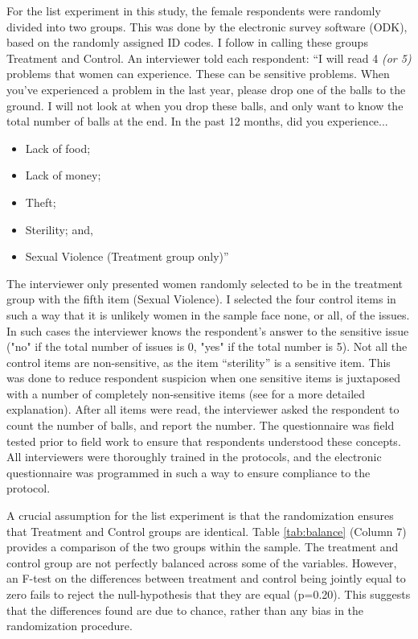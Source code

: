 For the list experiment in this study, the female respondents were randomly divided into two groups. This was done by the electronic survey software (ODK), based on the randomly assigned ID codes. I follow \cite{Imai2011} in calling these groups Treatment and Control. An interviewer told each respondent: ``I will read 4 \textit{(or 5)} problems that women can experience. These can be sensitive problems. When you've experienced a problem in the last year, please drop one of the balls to the ground. I will not look at when you drop these balls, and only want to know the total number of balls at the end. In the past 12 months, did you experience...

\begin{itemize}
	\singlespacing
	\item Lack of food;
	\item Lack of money;
	\item Theft;
	\item Sterility; and,
	\item Sexual Violence (Treatment group only)'' %
\end{itemize}

The interviewer only presented women randomly selected to be in the treatment group with the fifth item (Sexual Violence). I selected the four control items in such a way that it is unlikely women in the sample face none, or all, of the issues. In such cases the interviewer knows the respondent's answer to the sensitive issue ("no" if the total number of issues is 0, "yes" if the total number is 5). Not all the control items are non-sensitive, as the item ``sterility'' is a sensitive item. This was done to reduce respondent suspicion when one sensitive items is juxtaposed with a number of completely non-sensitive items (see \citet{Chuang2019} for a more detailed explanation). After all items were read, the interviewer asked the respondent to count the number of balls, and report the number. The questionnaire was field tested prior to field work to ensure that respondents understood these concepts. All interviewers were thoroughly trained in the protocols, and the electronic questionnaire was programmed in such a way to ensure compliance to the protocol.

A crucial assumption for the list experiment is that the randomization ensures that Treatment and Control groups are identical. Table \ref{tab:balance} (Column 7) provides a comparison of the two groups within the sample. The treatment and control group are not perfectly balanced across some of the variables. However, an F-test on the differences between treatment and control being jointly equal to zero fails to reject the null-hypothesis that they are equal (p=0.20). This suggests that the differences found are due to chance, rather than any bias in the randomization procedure.

